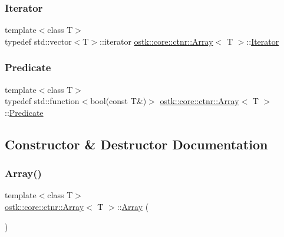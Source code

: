 \mbox{\label{classostk_1_1core_1_1ctnr_1_1_array_accf81dc56e553dad2ce7b72802836c46}} 
\subsubsection{\texorpdfstring{Iterator}{Iterator}}
{\footnotesize\ttfamily template$<$class T$>$ \\
typedef std\+::vector$<$T$>$\+::iterator \hyperlink{classostk_1_1core_1_1ctnr_1_1_array}{ostk\+::core\+::ctnr\+::\+Array}$<$ T $>$\+::\hyperlink{classostk_1_1core_1_1ctnr_1_1_array_accf81dc56e553dad2ce7b72802836c46}{Iterator}}

\mbox{\label{classostk_1_1core_1_1ctnr_1_1_array_a7c04a98dd10cd625acf96addd312d0af}} 
\subsubsection{\texorpdfstring{Predicate}{Predicate}}
{\footnotesize\ttfamily template$<$class T$>$ \\
typedef std\+::function$<$bool(const T\&)$>$ \hyperlink{classostk_1_1core_1_1ctnr_1_1_array}{ostk\+::core\+::ctnr\+::\+Array}$<$ T $>$\+::\hyperlink{classostk_1_1core_1_1ctnr_1_1_array_a7c04a98dd10cd625acf96addd312d0af}{Predicate}}



\subsection{Constructor \& Destructor Documentation}
\mbox{\label{classostk_1_1core_1_1ctnr_1_1_array_a49e6541f3f886d29c7f1e6702e57e3a9}} 
\subsubsection{\texorpdfstring{Array()}{Array()}\hspace{0.1cm}{\footnotesize\ttfamily [1/8]}}
{\footnotesize\ttfamily template$<$class T$>$ \\
\hyperlink{classostk_1_1core_1_1ctnr_1_1_array}{ostk\+::core\+::ctnr\+::\+Array}$<$ T $>$\+::\hyperlink{classostk_1_1core_1_1ctnr_1_1_array}{Array} (\begin{DoxyParamCaption}{ }\end{DoxyParamCaption})\hspace{0.3cm}{\ttfamily [delete]}}



